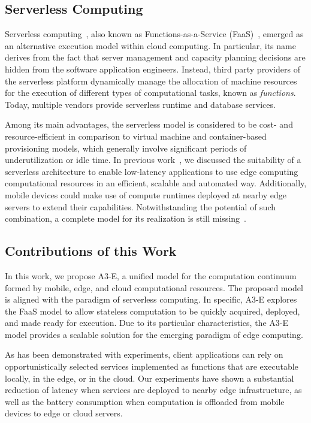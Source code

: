 \subsection{Serverless Computing}

Serverless computing~\cite{roberts2016serverless, hendrickson2016serverless}, also known as Functions-as-a-Service (FaaS)~\cite{mateosFaas17}, emerged as an alternative execution model within cloud computing. In particular, its name derives from the fact that server management and capacity planning decisions are hidden from the software application engineers. Instead, third party providers of the serverless platform dynamically manage the allocation of machine resources for the execution of different types of computational tasks, known as \textit{functions}. Today, multiple vendors provide serverless runtime and database services. 

Among its main advantages, the serverless model is considered to be cost- and resource-efficient in comparison to virtual machine and container-based provisioning models, which generally involve significant periods of underutilization or idle time. In previous work~\cite{GarrigaMendonca2017}, we discussed the suitability of a serverless architecture to enable low-latency applications to use edge computing computational resources in an efficient, scalable and automated way. Additionally, mobile devices could make use of compute runtimes deployed at nearby edge servers to extend their capabilities. Notwithstanding the potential of such combination, a complete model for its realization is still missing~\cite{NasticServerlessEdge17}. 

\subsection{Contributions of this Work}

In this work, we propose A3-E, a unified model for the computation continuum formed by mobile, edge, and cloud computational resources. The proposed model is aligned with the paradigm of serverless computing. In specific, A3-E explores the FaaS model to allow stateless computation to be quickly acquired, deployed, and made ready for execution. Due to  its particular characteristics, the A3-E model provides a scalable solution for the emerging paradigm of edge computing. 

As has been demonstrated with experiments, client applications can rely on opportunistically selected services implemented as functions that are executable locally, in the edge, or in the cloud. Our experiments have shown a substantial reduction of latency when services are deployed to nearby edge infrastructure, as well as the battery consumption when computation is offloaded from mobile devices to edge or cloud servers.

